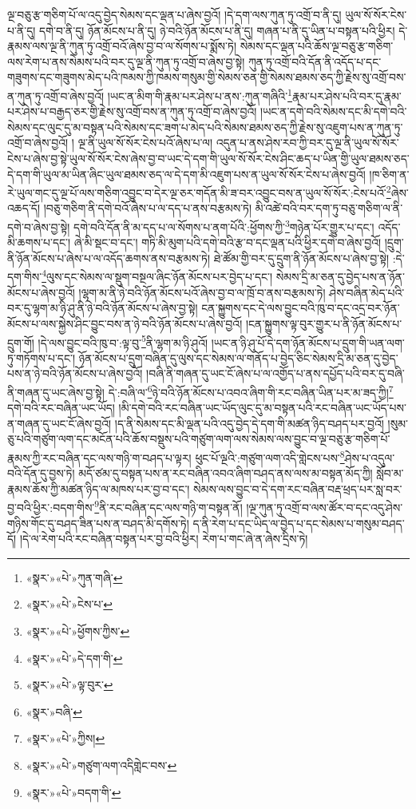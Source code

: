 ལྔ་བཅུ་རྩ་གཅིག་པོ་ལ་འདུ་བྱེད་སེམས་དང་ལྡན་པ་ཞེས་བྱའོ། །དེ་དག་ལས་ཀུན་ཏུ་འགྲོ་བ་ནི་དུ། ཡུལ་སོ་སོར་ངེས་པ་ནི་དུ། དགེ་བ་ནི་དུ། ཉོན་མོངས་པ་ནི་དུ། ཉེ་བའི་ཉོན་མོངས་པ་ནི་དུ། གཞན་པ་ནི་དུ་ཡིན་པ་བསྟན་པའི་ཕྱིར། དེ་རྣམས་ལས་ལྔ་ནི་ཀུན་ཏུ་འགྲོ་བའོ་ཞེས་བྱ་བ་ལ་སོགས་པ་སྨོས་ཏེ། སེམས་དང་ལྡན་པའི་ཆོས་ལྔ་བཅུ་རྩ་གཅིག་ལས་རེག་པ་ནས་སེམས་པའི་བར་དུ་ལྔ་ནི་ཀུན་ཏུ་འགྲོ་བ་ཞེས་བྱ་སྟེ། ཀུན་ཏུ་འགྲོ་བའི་དོན་ནི་འདོད་པ་དང་གཟུགས་དང་གཟུགས་མེད་པའི་ཁམས་ཀྱི་ཁམས་གསུམ་གྱི་སེམས་ཅན་གྱི་སེམས་ཐམས་ཅད་ཀྱི་རྗེས་སུ་འགྲོ་བས་ན་ཀུན་ཏུ་འགྲོ་བ་ཞེས་བྱའོ། །ཡང་ན་མིག་གི་རྣམ་པར་ཤེས་པ་ནས་:ཀུན་གཞིའི་\footnote{«སྣར་»«པེ་»ཀུན་གཞི་}རྣམ་པར་ཤེས་པའི་བར་དུ་རྣམ་པར་ཤེས་པ་བརྒྱད་ཅར་གྱི་རྗེས་སུ་འགྲོ་བས་ན་ཀུན་ཏུ་འགྲོ་བ་ཞེས་བྱའོ། །ཡང་ན་དགེ་བའི་སེམས་དང་མི་དགེ་བའི་སེམས་དང་ལུང་དུ་མ་བསྟན་པའི་སེམས་དང་ཟག་པ་མེད་པའི་སེམས་ཐམས་ཅད་ཀྱི་རྗེས་སུ་འཇུག་པས་ན་ཀུན་ཏུ་འགྲོ་བ་ཞེས་བྱའོ། །
ལྔ་ནི་ཡུལ་སོ་སོར་ངེས་པའོ་ཞེས་པ་ལ། འདུན་པ་ནས་ཤེས་རབ་ཀྱི་བར་དུ་ལྔ་ནི་ཡུལ་སོ་སོར་ངེས་པ་ཞེས་བྱ་སྟེ་ཡུལ་སོ་སོར་ངེས་ཞེས་བྱ་བ་ཡང་དེ་དག་གི་ཡུལ་སོ་སོར་ངེས་ཤིང་ཆད་པ་ཡིན་གྱི་ཡུལ་ཐམས་ཅད་དེ་དག་གི་ཡུལ་མ་ཡིན་ཞིང་ཡུལ་ཐམས་ཅད་ལ་དེ་དག་མི་འཇུག་པས་ན་ཡུལ་སོ་སོར་ངེས་པ་ཞེས་བྱའོ། །ཁ་ཅིག་ན་རེ་ཡུལ་གང་དུ་ལྔ་པོ་ལས་གཅིག་འབྱུང་བ་དེར་ལྔ་ཅར་གདོན་མི་ཟ་བར་འབྱུང་བས་ན་ཡུལ་སོ་སོར་:ངེས་པའོ་\footnote{«སྣར་»«པེ་»ངེས་པ་}ཞེས་འཆད་དོ། །བཅུ་གཅིག་ནི་དགེ་བའོ་ཞེས་པ་ལ་དད་པ་ནས་བརྩམས་ཏེ། མི་འཚེ་བའི་བར་དག་ཏུ་བཅུ་གཅིག་ལ་ནི་དགེ་བ་ཞེས་བྱ་སྟེ། དགེ་བའི་དོན་ནི་མ་དད་པ་ལ་སོགས་པ་ནག་པོའི་:ཕྱོགས་ཀྱི་\footnote{«སྣར་»«པེ་»ཕྱོགས་ཀྱིས་}གཉེན་པོར་གྱུར་པ་དང་། འདོད་མི་ཆགས་པ་དང་། ཞེ་མི་སྡང་བ་དང་། གཏི་མི་མུག་པའི་དགེ་བའི་རྩ་བ་དང་ལྡན་པའི་ཕྱིར་དགེ་བ་ཞེས་བྱའོ། །དྲུག་ནི་ཉོན་མོངས་པ་ཞེས་པ་ལ་འདོད་ཆགས་ནས་བརྩམས་ཏེ། ཐེ་ཚོམ་གྱི་བར་དུ་དྲུག་ནི་ཉོན་མོངས་པ་ཞེས་བྱ་སྟེ། :དེ་དག་གིས་\footnote{«སྣར་»«པེ་»དེ་དག་གི་}ལུས་དང་སེམས་ལ་སྡུག་བསྔལ་ཞིང་ཉོན་མོངས་པར་བྱེད་པ་དང་། སེམས་དྲི་མ་ཅན་དུ་བྱེད་པས་ན་ཉོན་མོངས་པ་ཞེས་བྱའོ། །ལྷག་མ་ནི་ཉེ་བའི་ཉོན་མོངས་པའོ་ཞེས་བྱ་བ་ལ་ཁྲོ་བ་ནས་བརྩམས་ཏེ། ཤེས་བཞིན་མེད་པའི་བར་དུ་ལྷག་མ་ཉི་ཤུ་ནི་ཉེ་བའི་ཉོན་མོངས་པ་ཞེས་བྱ་སྟེ། ངན་སྐྱུགས་དང་དེ་ལས་བྱུང་བའི་ཁུ་བ་དང་འདྲ་བར་ཉོན་མོངས་པ་ལས་སྐྱེས་ཤིང་བྱུང་བས་ན་ཉེ་བའི་ཉོན་མོངས་པ་ཞེས་བྱའོ། །ངན་སྐྱུགས་ལྟ་བུར་གྱུར་པ་ནི་ཉོན་མོངས་པ་དྲུག་གོ། །དེ་ལས་བྱུང་བའི་ཁུ་བ་:ལྟ་བུ་\footnote{«སྣར་»«པེ་»ལྟ་བུར་}ནི་ལྷག་མ་ཉི་ཤུའོ། །ཡང་ན་ཉི་ཤུ་པོ་དེ་དག་ཉོན་མོངས་པ་དྲུག་གི་ཡན་ལག་ཏུ་གཏོགས་པ་དང་། ཉོན་མོངས་པ་དྲུག་བཞིན་དུ་ལུས་དང་སེམས་ལ་གནོད་པ་བྱེད་ཅིང་སེམས་དྲི་མ་ཅན་དུ་བྱེད་པས་ན་ཉེ་བའི་ཉོན་མོངས་པ་ཞེས་བྱའོ། །བཞི་ནི་གཞན་དུ་ཡང་ངོ་ཞེས་པ་ལ་འགྱོད་པ་ནས་དཔྱོད་པའི་བར་དུ་བཞི་ནི་གཞན་དུ་ཡང་ཞེས་བྱ་སྟེ། དེ་:བཞི་ལ་\footnote{«སྣར་»བཞི་}ཉེ་བའི་ཉོན་མོངས་པ་འབའ་ཞིག་གི་རང་བཞིན་ཡིན་པར་མ་ཟད་ཀྱི།\footnote{«སྣར་»«པེ་»ཀྱིས།} དགེ་བའི་རང་བཞིན་ཡང་ཡོད། །མི་དགེ་བའི་རང་བཞིན་ཡང་ཡོད་ལུང་དུ་མ་བསྟན་པའི་རང་བཞིན་ཡང་ཡོད་པས་ན་གཞན་དུ་ཡང་ངོ་ཞེས་བྱའོ། །ད་ནི་སེམས་དང་མི་ལྡན་པའི་འདུ་བྱེད་དེ་དག་གི་མཚན་ཉིད་བཤད་པར་བྱའོ། །སུམ་ཅུ་པའི་གཙུག་ལག་དང་མངོན་པའི་ཆོས་བསྡུས་པའི་གཙུག་ལག་ལས་སེམས་ལས་བྱུང་བ་ལྔ་བཅུ་རྩ་གཅིག་པོ་རྣམས་ཀྱི་རང་བཞིན་དང་ལས་གཉི་ག་བཤད་པ་ལྟར། ཕུང་པོ་ལྔའི་:གཙུག་ལག་འདི་གླེངས་པས་\footnote{«སྣར་»«པེ་»གཙུག་ལག་འདིགླེང་བས་}ཤེས་པ་འདུལ་བའི་དོན་དུ་བྱས་ཏེ། མདོ་ཙམ་དུ་བསྟན་པས་ན་རང་བཞིན་འབའ་ཞིག་བཤད་ནས་ལས་མ་བསྟན་མོད་ཀྱི། སློབ་མ་རྣམས་ཆོས་ཀྱི་མཚན་ཉིད་ལ་མཁས་པར་བྱ་བ་དང་། སེམས་ལས་བྱུང་བ་དེ་དག་རང་བཞིན་བརྡ་ཕྲད་པར་སླ་བར་བྱ་བའི་ཕྱིར་:བདག་གིས་\footnote{«སྣར་»«པེ་»བདག་གི་}ནི་རང་བཞིན་དང་ལས་གཉི་ག་བསྟན་ནོ། །ལྔ་ཀུན་ཏུ་འགྲོ་བ་ལས་ཚོར་བ་དང་འདུ་ཤེས་གཉིས་གོང་དུ་བཤད་ཟིན་པས་ན་བཤད་མི་དགོས་ཏེ། ད་ནི་རེག་པ་དང་ཡིད་ལ་བྱེད་པ་དང་སེམས་པ་གསུམ་བཤད་དོ། །དེ་ལ་རེག་པའི་རང་བཞིན་བསྟན་པར་བྱ་བའི་ཕྱིར། རེག་པ་གང་ཞེ་ན་ཞེས་དྲིས་ཏེ། 